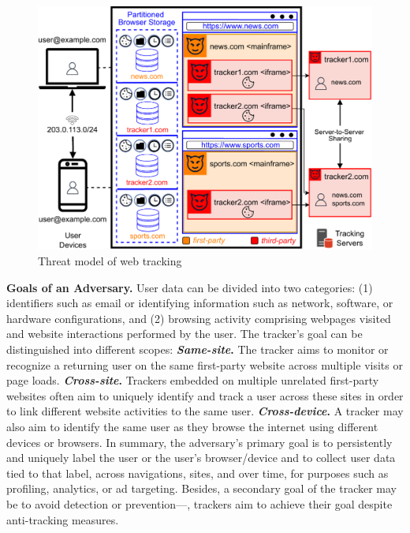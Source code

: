 \begin{figure}
    \vspace{-2mm}
    \centering
    \includegraphics[width=0.99\linewidth]{figures/threat-model.pdf}
    \caption{Threat model of web tracking}
    \label{fig:threat-model}
    \vspace{-3mm} %
\end{figure}



\noindent \textbf{Goals of an Adversary.} 
%
%
User data can be divided into two categories: (1) identifiers such as email or identifying information such as network, software, or hardware configurations, and (2) browsing activity comprising webpages visited and website interactions performed by the user. 
%
The tracker's goal can be distinguished into different scopes:
%
\noindent \textbf{\textit{Same-site}.} 
The tracker aims to monitor or recognize a returning user on the same first-party website across multiple visits or page loads. 
%
\textbf{\textit{Cross-site}.} 
%
Trackers embedded on multiple unrelated first-party websites often aim to uniquely identify and track a user across these sites in order to link different website activities to the same user.
%
\textbf{\textit{Cross-device}.} 
%
A tracker may also aim to identify the same user as they browse the internet using different devices or browsers. 
%
%
In summary, the adversary's primary goal is to persistently and uniquely label the user or the user’s browser/device and to collect user data tied to that label, across navigations, sites, and over time, for purposes such as profiling, analytics, or ad targeting.
%
Besides, a secondary goal of the tracker may be to avoid detection or prevention---\ie{}, trackers aim to achieve their goal despite anti-tracking measures.


